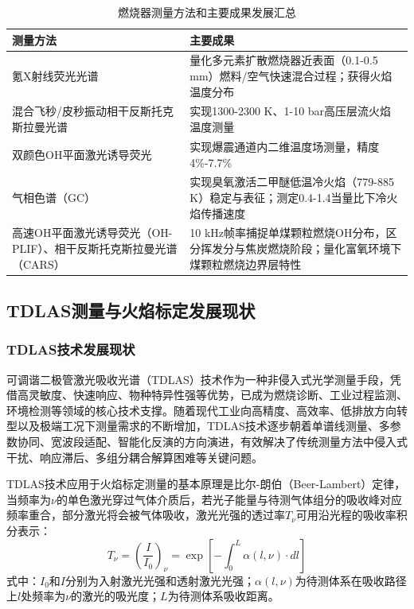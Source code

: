 \begin{table}[H]
	\centering
	\caption{燃烧器测量方法和主要成果发展汇总}
	\label{tab:measurement_methods}
	\begin{tabular}{p{5cm}p{10cm}}
		\toprule
		测量方法 & 主要成果 \\
		\midrule
		氪X射线荧光光谱 & 量化多元素扩散燃烧器近表面（0.1-0.5 mm）燃料/空气快速混合过程；获得火焰温度分布\cite{alqasemi2023temperature} \\
		混合飞秒/皮秒振动相干反斯托克斯拉曼光谱 & 实现1300-2300 K、1-10 bar高压层流火焰温度测量\cite{braun2022spatially} \\
		双颜色OH平面激光诱导荧光 & 实现爆震通道内二维温度场测量，精度4\%-7.7\%\cite{hsu2021khz} \\
		气相色谱（GC） & 实现臭氧激活二甲醚低温冷火焰（779-885 K）稳定与表征；测定0.4-1.4当量比下冷火焰传播速度 \\
		高速OH平面激光诱导荧光（OH-PLIF）、相干反斯托克斯拉曼光谱（CARS） & 10 kHz帧率捕捉单煤颗粒燃烧OH分布，区分挥发分与焦炭燃烧阶段；量化富氧环境下煤颗粒燃烧边界层特性\cite{koser2019multi, shi2022compact} \\
		\bottomrule
	\end{tabular}
\end{table}

\subsection{TDLAS测量与火焰标定发展现状}

\subsubsection{TDLAS技术发展现状}

可调谐二极管激光吸收光谱（TDLAS）技术作为一种非侵入式光学测量手段，凭借高灵敏度、快速响应、物种特异性强等优势，已成为燃烧诊断、工业过程监测、环境检测等领域的核心技术支撑。随着现代工业向高精度、高效率、低排放方向转型以及极端工况下测量需求的不断增加，TDLAS技术逐步朝着单谱线测量、多参数协同、宽波段适配、智能化反演的方向演进，有效解决了传统测量方法中侵入式干扰、响应滞后、多组分耦合解算困难等关键问题\cite{liu2022tunable}。

TDLAS技术应用于火焰标定测量的基本原理是比尔-朗伯（Beer-Lambert）定律，当频率为$\nu$的单色激光穿过气体介质后，若光子能量与待测气体组分的吸收峰对应频率重合，部分激光将会被气体吸收，激光光强的透过率$T_\nu$可用沿光程的吸收率积分表示：
\begin{equation}
	T_\nu = \left(\frac{I}{I_0}\right)_\nu = \exp\left[-\int_0^L \alpha(l,\nu) \cdot dl\right]
	\label{eq:beer_lambert}
\end{equation}
式中：$I_0$和$I$分别为入射激光光强和透射激光光强；$\alpha(l,\nu)$为待测体系在吸收路径上$l$处频率为$\nu$的激光的吸光度；$L$为待测体系吸收距离。

